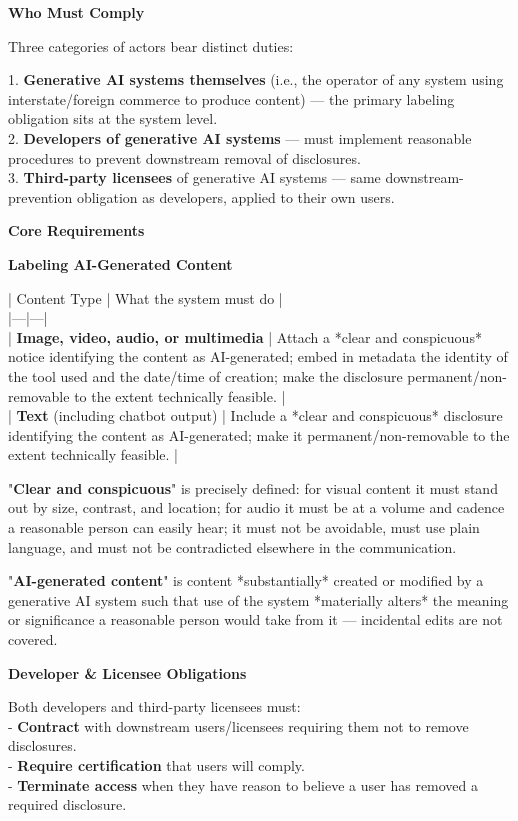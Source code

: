 \documentclass[11pt]{article}
\begin{document}
\textbf{Who Must Comply}

Three categories of actors bear distinct duties:

1. \textbf{Generative AI systems themselves} (i.e., the operator of any system using interstate/foreign commerce to produce content) --- the primary labeling obligation sits at the system level. \\
2. \textbf{Developers of generative AI systems} --- must implement reasonable procedures to prevent downstream removal of disclosures. \\
3. \textbf{Third-party licensees} of generative AI systems --- same downstream-prevention obligation as developers, applied to their own users.

\textbf{Core Requirements}

\textbf{Labeling AI-Generated Content}

| Content Type | What the system must do | \\
|---|---| \\
| \textbf{Image, video, audio, or multimedia} | Attach a *clear and conspicuous* notice identifying the content as AI-generated; embed in metadata the identity of the tool used and the date/time of creation; make the disclosure permanent/non-removable to the extent technically feasible. | \\
| \textbf{Text} (including chatbot output) | Include a *clear and conspicuous* disclosure identifying the content as AI-generated; make it permanent/non-removable to the extent technically feasible. |

"\textbf{Clear and conspicuous}" is precisely defined: for visual content it must stand out by size, contrast, and location; for audio it must be at a volume and cadence a reasonable person can easily hear; it must not be avoidable, must use plain language, and must not be contradicted elsewhere in the communication.

"\textbf{AI-generated content}" is content *substantially* created or modified by a generative AI system such that use of the system *materially alters* the meaning or significance a reasonable person would take from it --- incidental edits are not covered.

\textbf{Developer \& Licensee Obligations}

Both developers and third-party licensees must: \\
- \textbf{Contract} with downstream users/licensees requiring them not to remove disclosures. \\
- \textbf{Require certification} that users will comply. \\
- \textbf{Terminate access} when they have reason to believe a user has removed a required disclosure.
\end{document}

